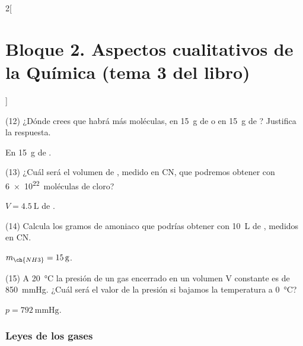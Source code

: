 \documentclass[10pt]{article}
\begin{document}
\begin{multicols}{2}[
    \section{Bloque 2. Aspectos cualitativos de la Química (tema 3 del libro)}
  ]
\begin{exercise}[
    tags    = {},
    topics  = {química,química básica},
    source  = {FQ 1B MGH 2016, p84, e12},
  ]
  (12) ¿Dónde crees que habrá más moléculas, en \SI{15}{g} de  o en
  \SI{15}{g} de ? Justifica la respuesta.
\end{exercise}

\begin{solution}
  En \SI{15}{g} de .
\end{solution}




\begin{exercise}[
    tags    = {},
    topics  = {química,química básica},
    source  = {FQ 1B MGH 2016, p84, e13},
  ]
  (13) ¿Cuál será el volumen de , medido en CN, que podremos
  obtener con \SI{6e22}{moléculas} de cloro?
\end{exercise}

\begin{solution}
  \( V = \SI{4.5}{\liter} \) de .
\end{solution}




\begin{exercise}[
    tags    = {},
    topics  = {química,química básica},
    source  = {FQ 1B MGH 2016, p84, e14},
  ]
  (14) Calcula los gramos de amoniaco que podrías obtener con \SI{10}{\liter}
  de , medidos en CN.
\end{exercise}

\begin{solution}
  \( m_{\ch{NH3}} = \SI{15}{g} \).
\end{solution}




\begin{exercise}[
    tags    = {},
    topics  = {química,química básica},
    source  = {FQ 1B MGH 2016, p84, e15},
  ]
  (15) A \SI{20}{\celsius} la presión de un gas encerrado en un volumen V constante es de \SI{850}{\mmHg}. ¿Cuál será el valor de la presión si bajamos la temperatura a \SI{0}{\celsius}?
\end{exercise}

\begin{solution}
  \( p = \SI{792}{\mmHg} \).
\end{solution}



\subsubsection{Leyes de los gases}


\end{multicols}
\end{document}
